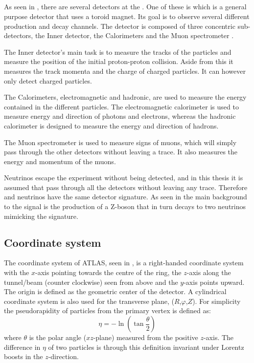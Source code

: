 \subsection{\abbrATLAS}\label{ATLAS}
As seen in , there are several detectors at the \abbrLHC. One of these is \abbrATLAS which is a general purpose detector that uses a toroid magnet. Its goal is to observe several different production and decay channels. The detector is composed of three concentric sub-detectors, the Inner detector, the Calorimeters and the Muon spectrometer \citep{1129811}.

The Inner detector's main task is to measure the tracks of the particles and measure the position of the initial proton-proton collision. Aside from this it measures the track momenta and the charge of charged particles. It can however only detect charged particles.

The Calorimeters, electromagnetic and hadronic, are used to measure the energy contained in the different particles. The electromagnetic calorimeter is used to measure energy and direction of photons and electrons, whereas the hadronic calorimeter is designed to measure the energy and direction of hadrons.

The Muon spectrometer is used to measure signs of muons, which will simply pass through the other detectors without leaving a trace. It also measures the energy and momentum of the muons.

Neutrinos escape the \abbrATLAS experiment without being detected, and in this thesis it is assumed that \abbrWIMPS pass through all the detectors without leaving any trace. Therefore \abbrWIMPS and neutrinos have the same detector signature. As seen in  the main background to the \abbrWIMP signal is the production of a Z-boson that in turn decays to two neutrinos mimicking the \abbrWIMP signature.
\newpage
\subsection{Coordinate system}\label{sec:eo:subsec:coord}
The coordinate system of ATLAS, seen in , is a right-handed coordinate system with the $x$-axis pointing towards the centre of the \abbrLHC ring, the $z$-axis along the tunnel/beam (counter clockwise) seen from above and the $y$-axis points upward. The origin is defined as the geometric center of the detector. A cylindrical coordinate system is also used for the transverse plane, ($R$,$\varphi$,$Z$).
For simplicity the pseudorapidity of particles from the primary vertex is defined as:
\begin{equation}
\eta = - \ln( \tan\frac{\theta}{2})
\end{equation}
where $\theta$ is the polar angle ($xz$-plane) measured from the positive $z$-axis. The difference in $\eta$ of two particles is through this definition invariant under Lorentz boosts in the $z$-direction.

